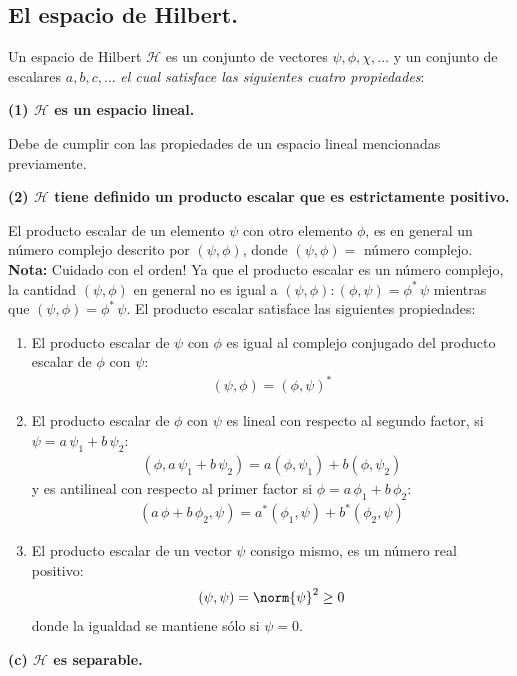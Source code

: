 \subsection{El espacio de Hilbert.}
Un espacio de Hilbert $\mathcal{H}$ es un conjunto de vectores $\psi, \phi, \chi, \ldots$ y un conjunto de escalares $a, b, c, \ldots$ \emph{el cual satisface las siguientes cuatro propiedades}:

\textbf{(1) $\mathcal{H}$ es un espacio lineal.}

Debe de cumplir con las propiedades de un espacio lineal mencionadas previamente.

\textbf{(2) $\mathcal{H}$ tiene definido un producto escalar que es estrictamente positivo.}

El producto escalar de un elemento $\psi$ con otro elemento $\phi$, es en general un número complejo descrito por $(\psi, \phi)$, donde $(\psi, \phi) =$ número complejo. \textbf{Nota: } Cuidado con el orden! Ya que el producto escalar es un número complejo, la cantidad  $(\psi, \phi)$ en general no es igual a  $(\psi, \phi) : (\phi, \psi) = \phi^{*} \, \psi$ mientras que $(\psi, \phi) = \phi^{*} \, \psi$. El producto escalar satisface las siguientes propiedades:
\begin{enumerate}[label=\roman*)]
\item El producto escalar de $\psi$ con $\phi$ es igual al complejo conjugado del producto escalar de $\phi$ con $\psi$:
\begin{align}
(\psi, \phi) = (\phi, \psi)^{*}
\label{eq:ecuacion_02_04}
\end{align}
\item El producto escalar de $\phi$ con $\psi$ es lineal con respecto al segundo factor, si $\psi = a \, \psi_{1} + b \, \psi_{2}$:
\begin{align}
(\phi, a \, \psi_{1} + b \, \psi_{2} ) = a (\phi, \psi_{1}) + b (\phi, \psi_{2})
\label{eq:ecuacion_02_05}
\end{align}
y es antilineal con respecto al primer factor si $\phi = a \, \phi_{1} + b \, \phi_{2}$:
\begin{align}
(a \, \phi + b \, \phi_{2}, \psi) = a^{*} (\phi_{1}, \psi) + b^{*} (\phi_{2}, \psi)
\label{eq:ecuacion_02_06}
\end{align}
\item El producto escalar de un vector $\psi$ consigo mismo, es un número real positivo:
\begin{align}
(\psi, \psi) = \norm{\psi}^{2} \geq 0
\label{eq:ecuacion_02_07}
\end{align}
donde la igualdad se mantiene sólo si $\psi = 0$.
\end{enumerate}
\textbf{(c) $\mathcal{H}$ es separable.}

